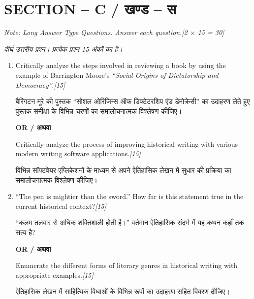 \documentclass[11pt,a4paper]{article}
\newcommand{\pts}[1]{\hfill \textit{[#1]}}
\begin{document}
\bigskip

\section*{SECTION -- C / खण्ड -- स}
\noindent \textit{Note: Long Answer Type Questions. Answer each question.}\pts{2 $\times$ 15 = 30}

\noindent \textit{दीर्घ उत्तरीय प्रश्न। प्रत्येक प्रश्न 15 अंकों का है।}

\begin{enumerate}[label=\textbf{\arabic*.},leftmargin=*,start=5,itemsep=14pt]

  \item Critically analyze the steps involved in reviewing a book by using the example of Barrington Moore's \textit{``Social Origins of Dictatorship and Democracy''}.\pts{15}
  
  बैरिंगटन मूरे की पुस्तक ``सोशल ओरिजिन्स ऑफ डिक्टेटरशिप एंड डेमोक्रेसी'' का उदाहरण लेते हुए पुस्तक समीक्षा के विभिन्न चरणों का समालोचनात्मक विश्लेषण कीजिए।

  \begin{center}\textbf{OR / अथवा}\end{center}

  Critically analyze the process of improving historical writing with various modern writing software applications.\pts{15}
  
  विभिन्न सॉफ्टवेयर एप्लिकेशनों के माध्यम से अपने ऐतिहासिक लेखन में सुधार की प्रक्रिया का समालोचनात्मक विश्लेषण कीजिए।

  \item ``The pen is mightier than the sword.'' How far is this statement true in the current historical context?\pts{15}
  
  ``कलम तलवार से अधिक शक्तिशाली होती है।'' वर्तमान ऐतिहासिक संदर्भ में यह कथन कहाँ तक सत्य है?

  \begin{center}\textbf{OR / अथवा}\end{center}

  Enumerate the different forms of literary genres in historical writing with appropriate examples.\pts{15}
  
  ऐतिहासिक लेखन में साहित्यिक विधाओं के विभिन्न रूपों का उदाहरण सहित विवरण दीजिए।

\end{enumerate}
\end{document}
